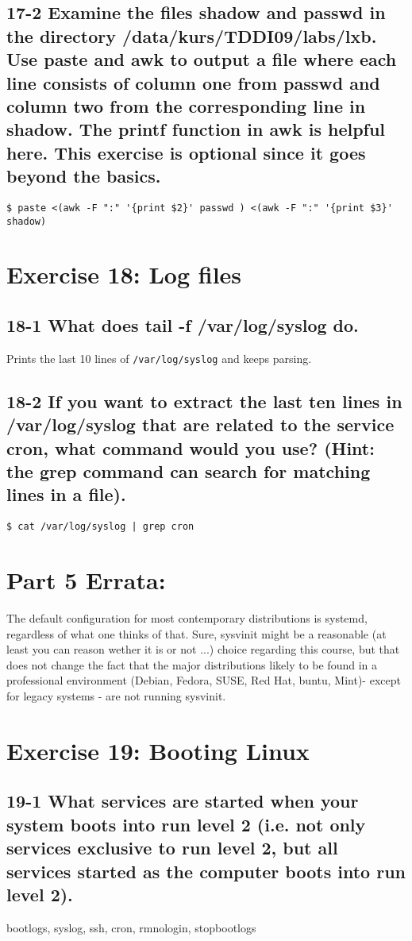 \subsection{17-2 Examine the files shadow and passwd in the directory /data/kurs/TDDI09/labs/lxb. Use paste and awk to output a file where each line consists of column one from passwd and column two from the corresponding line in shadow. The printf function in awk is helpful here. This exercise is optional since it goes beyond the basics.}
\begin{verbatim}$ paste <(awk -F ":" '{print $2}' passwd ) <(awk -F ":" '{print $3}' shadow)\end{verbatim}

\section{Exercise 18: Log files}
\subsection{18-1 What does tail -f /var/log/syslog do.}
Prints the last 10 lines of \verb=/var/log/syslog= and keeps parsing.

\subsection{18-2 If you want to extract the last ten lines in /var/log/syslog that are related to the service cron, what command would you use? (Hint: the grep command can search for matching lines in a file).}
\verb=$ cat /var/log/syslog | grep cron=

\section{Part 5 Errata:}
The default configuration for most contemporary distributions is systemd, regardless of what one thinks of that. Sure, sysvinit might be a reasonable (at least you can reason wether it is or not ...) choice regarding this course, but that does not change the fact that the major distributions likely to be found in a professional environment (Debian, Fedora, SUSE, Red Hat, \*buntu, Mint)- except for legacy systems - are not running sysvinit.

\section{Exercise 19: Booting Linux}
\subsection{19-1 What services are started when your system boots into run level 2 (i.e. not only services exclusive to run level 2, but all services started as the computer boots into run level 2).}
bootlogs, syslog, ssh, cron, rmnologin, stopbootlogs

